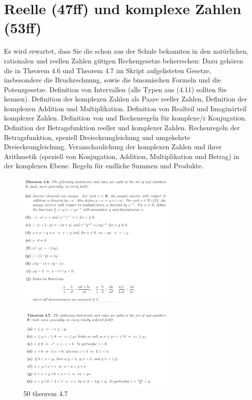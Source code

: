 \section{Reelle (47ff) und komplexe Zahlen (53ff)}
Es wird erwartet, dass Sie die schon aus der Schule bekannten in den natürlichen, rationalen und reellen Zahlen gütigen Rechengesetze beherrschen: Dazu gehören die in Theorem 4.6 und Theorem 4.7 im Skript aufgelisteten Gesetze, insbesondere die Bruchrechnung, sowie die binomischen Formeln und die Potenzgesetze. Definition von Intervallen (alle Typen aus (4.11) sollten Sie kennen). Definition der komplexen Zahlen als Paare reeller Zahlen, Definition der komplexen Addition und Multiplikation. Definition von Realteil und Imaginärteil komplexer Zahlen. Definition von und Rechenregeln für komplexe/r Konjugation. Definition der Betragsfunktion reeller und komplexer Zahlen. Rechenregeln der Betragsfunktion, speziell Dreiecksungleichung und umgekehrte Dreiecksungleichung. Veranschaulichung der komplexen Zahlen und ihrer Arithmetik (speziell von Konjugation, Addition, Multiplikation und Betrag) in der komplexen Ebene. Regeln für endliche Summen und Produkte. 

\begin{figure}[H] \centering
\includegraphics[width=0.7\textwidth]{media/4.png}
\end{figure}

\begin{figure}[H]
	\centering
  \includegraphics[width=0.7\textwidth]{media/50-theorem-4-7.png}
	\caption{50 theorem 4.7}
	\label{50_theorem_4.7}
\end{figure}

